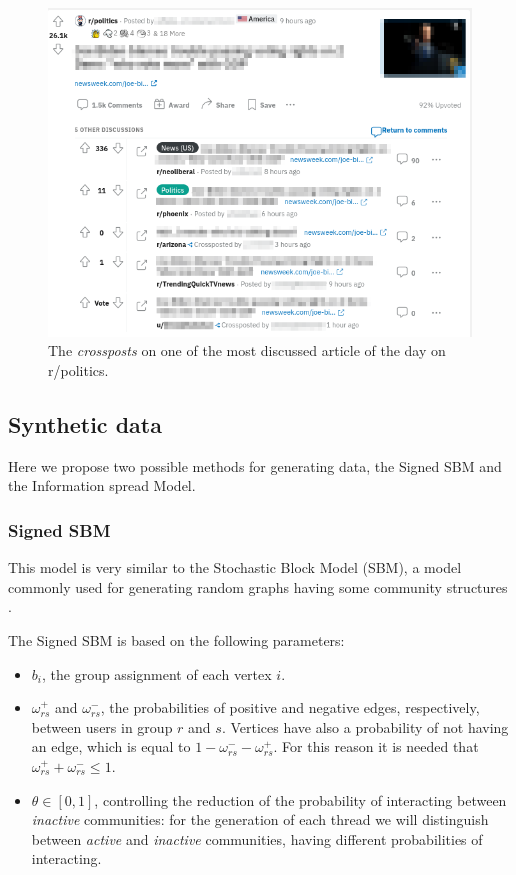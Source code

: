 \begin{figure}
	\centering
	\includegraphics[width=0.8\linewidth]{tex/img/reddit-crossposts.png}
	\caption{The \emph{crossposts} on one of the most discussed article of the
		day on r/politics.}%
	\label{fig:tex/img/reddit-crossposts}
\end{figure}

\subsection{Synthetic data}%
\label{sub:synthetic_data}

Here we propose two possible methods for generating data, the Signed SBM and
the Information spread Model.

\subsubsection{Signed SBM}%
\label{ssub:signed_sbm}

This model is very similar to the Stochastic Block Model (SBM), a model
commonly used for generating random graphs having some community structures
\cite{Newman2018}.

The Signed SBM is based on the following parameters:
\begin{itemize}
	\item $b_{i} $, the group assignment of each vertex $i$.
	\item $\omega ^{+} _{rs} $ and $\omega ^{-} _{rs} $, the probabilities
	      of positive and negative edges, respectively, between users in
	      group $r$ and $s$. Vertices have also a probability of not having an
	      edge, which is equal to $1 - \omega ^{-} _{rs} - \omega ^{+} _{rs} $.
	      For this reason it is needed that $\omega ^{+} _{rs} + \omega ^{-} _{rs} \leq 1$.
	\item $\theta \in [0, 1]$, controlling the reduction of the probability of interacting
	      between \emph{inactive} communities: for the generation of each
	      thread we will distinguish between \emph{active} and \emph{inactive}
	      communities, having different probabilities of interacting.
\end{itemize}

